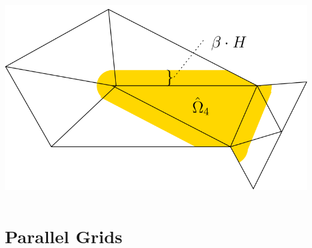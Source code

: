 \documentclass[aspectratio=169,11pt]{beamer}
\theoremstyle{definition}
\begin{document}
\begin{frame}
\begin{columns}
\begin{column}{0.4\linewidth}
\begin{onlyenv}
        \vskip5mm
        \includegraphics[width=.36\linewidth]{konstr_uberl_unstr}
      \end{onlyenv}
    \end{column}
  \end{columns}
\end{frame}

\section{Parallel Grids}

\end{document}
